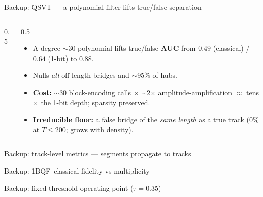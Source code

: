 \begin{frame}{Backup: QSVT --- a polynomial filter lifts true/false separation}
  \begin{columns}[T]
    \begin{column}{0.5\textwidth}
      \centering{}
    \end{column}
    \begin{column}{0.5\textwidth}
      \begin{itemize}
        \item A degree-$\sim$30 polynomial lifts true/false \textbf{AUC} from $0.49$ (classical) / $0.64$ (1-bit) to $\mathbf{0.88}$.
        \item Nulls \emph{all} off-length bridges and $\sim$95\% of hubs.
        \item \textbf{Cost:} $\sim$30 block-encoding calls $\times$ $\sim$2$\times$ amplitude-amplification $\approx$ tens$\times$ the 1-bit depth; sparsity preserved.
        \item \textbf{Irreducible floor:} a false bridge of the \emph{same length} as a true track (0\% at $T\le200$; grows with density).
      \end{itemize}
    \end{column}
  \end{columns}
\end{frame}

\begin{frame}{Backup: track-level metrics --- segments propagate to tracks}
  \centering{}\\
\end{frame}

\begin{frame}{Backup: 1BQF--classical fidelity vs multiplicity}
  \centering{}\\
\end{frame}

\begin{frame}{Backup: fixed-threshold operating point ($\tau=0.35$)}
  \centering{}\\
\end{frame}

